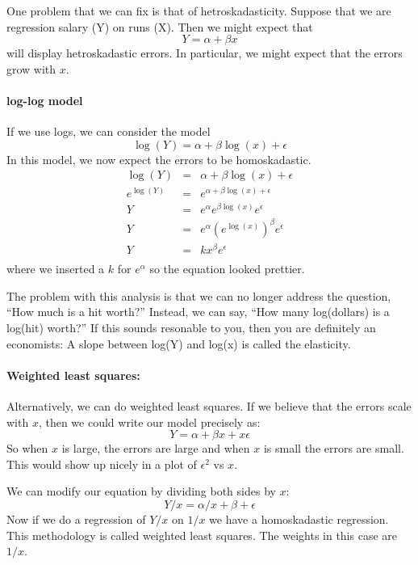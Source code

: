 \documentclass{article}
\begin{document}
One problem that we can fix is that of hetroskadasticity.  Suppose
that we are regression salary (Y) on runs (X).  Then we might expect
that 
\begin{displaymath}
Y = \alpha + \beta x
\end{displaymath}
will display hetroskadastic errors.  In particular, we might expect
that the errors grow with $x$.  

\paragraph{log-log model}  If we use logs, we can consider the model
\begin{displaymath}
\log(Y) = \alpha + \beta \log(x) + \epsilon
\end{displaymath}
In this model, we now expect the errors to be homoskadastic.  
\begin{eqnarray*}
\log(Y) & = & \alpha + \beta \log(x) + \epsilon\\
e^{\log(Y)} & = & e^{\alpha + \beta \log(x) + \epsilon}\\
Y & = & e^{\alpha} e^{\beta \log(x)} e^{\epsilon}\\
Y & = & e^{\alpha} (e^{\log(x)})^\beta  e^{\epsilon}\\
Y & = & k x^\beta  e^{\epsilon}\\
\end{eqnarray*}
where we inserted a $k$ for $e^{\alpha}$ so the equation looked
prettier. 

The problem with this analysis is that we can no longer address the
question, ``How much is a hit worth?''  Instead, we can say, ``How
many log(dollars) is a log(hit) worth?''  If this sounds resonable to
you, then you are definitely an economists:  A slope between
log(Y) and log(x) is called the elasticity.

\paragraph{Weighted least squares:} Alternatively, we can do weighted
least squares.  If we believe that the errors scale with $x$, then we
could write our model precisely as:
\begin{displaymath}
Y = \alpha + \beta x + x \epsilon
\end{displaymath}
So when $x$ is large, the errors are large and when $x$ is small the
errors are small.  This would show up nicely in a plot of $\epsilon^2$
vs $x$.  

We can modify our equation by dividing both sides by $x$:
\begin{displaymath}
Y/x = \alpha/x + \beta +  \epsilon
\end{displaymath}
Now if we do a regression of $Y/x$ on $1/x$ we have a homoskadastic
regression.  This methodology is called weighted least squares.  The
weights in this case are $1/x$.
\end{document}
